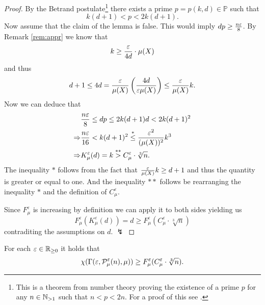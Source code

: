 \begin{proof}
  By the Betrand postulate\footnote{This is a theorem from number theory proving the existence of a prime $p$ for any $n\in \N_{>1}$ such that $n < p < 2n$. For a proof of this see \cite{Chebyshev1852}.}
  there exists a prime $p = p(k,d) \in \mathbb{P}$ such that \[k(d+1) < p < 2k(d+1).\]
  Now assume that the claim of the lemma is false. This would imply $dp \geq {n\varepsilon \over 8}$. By Remark \ref{rem:appr} we know that \[k \geq {\varepsilon \over 4d} \cdot \mu(X)\] and thus
  \begin{equation*}
    d+1 \leq 4d = {\varepsilon \over \mu(X)}\left({4d \over \varepsilon \mu(X)}\right)\leq {\varepsilon \over \mu(X)} k. 
  \end{equation*}
  Now we can deduce that
  \begin{align*}
    &{n\varepsilon \over 8} \leq dp \leq 2k(d+1)d < 2k(d+1)^2 \\
    \Rightarrow & {n\varepsilon \over 16} < k(d+1)^2 \overset{*}{\leq} {\varepsilon^2\over (\mu(X))^2}k^3 \\
    \Rightarrow & K_\mu^\varepsilon(d) = k \overset{**}{>} C_\mu^\varepsilon\cdot \sqrt[3]{n}.
  \end{align*}
  The inequality $*$ follows from the fact that ${\varepsilon \over \mu(X)}k \geq d+1$ and thus the quantity is greater or equal to one. And the inequality $**$ follows be rearranging the inequality $*$ and the definition of $C_\mu^\varepsilon$.

  Since $F_\mu^\varepsilon$ is increasing by definition we can apply it to both sides yielding us
  \begin{equation*}
    F_\mu^\varepsilon(K_\mu^\varepsilon(d)) = d \geq F_\mu^\varepsilon(C_\mu^\varepsilon\cdot\sqrt[3]{n})
  \end{equation*}
  contraditing the assumptions on $d$. $\lightning$
\end{proof}

\begin{thm}\label{thm:gammain}
  For each $\varepsilon \in \R_{\geq 0}$ it holds that \[\chi(\Gamma(\varepsilon, \P^\varepsilon_\mu(n), \mu)) \geq F^\varepsilon_\mu(C^\varepsilon_\mu \cdot \sqrt[3]{n}).\]
\end{thm}

\newcommand{\h}{h_{m_q-1-q_0}}
\newcommand{\hh}{h_{m_q-q_0}}

